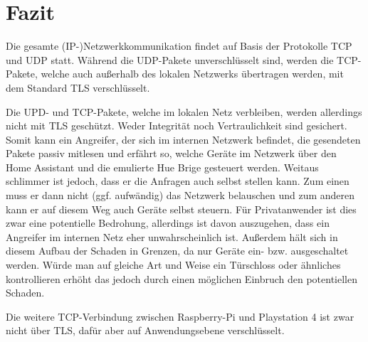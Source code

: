 \newpage
\section{Fazit}\label{sec:fazit}

Die gesamte (IP-)Netzwerkkommunikation findet auf Basis der Protokolle TCP und UDP statt.
Während die UDP-Pakete unverschlüsselt sind,
werden die TCP-Pakete, welche auch außerhalb des lokalen Netzwerks übertragen werden,
mit dem Standard TLS verschlüsselt.

Die UPD- und TCP-Pakete, welche im lokalen Netz verbleiben, werden allerdings nicht mit TLS geschützt.
Weder Integrität noch Vertraulichkeit sind gesichert.
Somit kann ein Angreifer, der sich im internen Netzwerk befindet,
die gesendeten Pakete passiv mitlesen und erfährt so,
welche Geräte im Netzwerk über den Home Assistant und die emulierte Hue Brige gesteuert werden.
Weitaus schlimmer ist jedoch, dass er die Anfragen auch selbst stellen kann.
Zum einen muss er dann nicht (ggf. aufwändig) das Netzwerk belauschen
und zum anderen kann er auf diesem Weg auch Geräte selbst steuern.
Für Privatanwender ist dies zwar eine potentielle Bedrohung,
allerdings ist davon auszugehen, dass ein Angreifer im internen Netz eher unwahrscheinlich ist.
Außerdem hält sich in diesem Aufbau der Schaden in Grenzen, da nur Geräte ein- bzw. ausgeschaltet werden.
Würde man auf gleiche Art und Weise ein Türschloss oder ähnliches kontrollieren erhöht das jedoch durch einen
möglichen Einbruch den potentiellen Schaden.

Die weitere TCP-Verbindung zwischen Raspberry-Pi und Playstation 4 ist zwar nicht über TLS,
dafür aber auf Anwendungsebene verschlüsselt.
